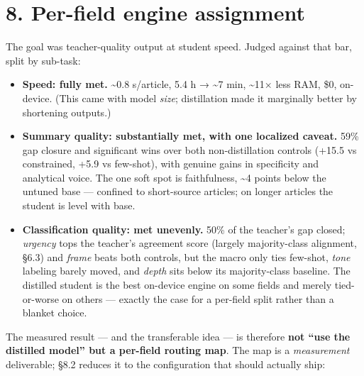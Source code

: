 \documentclass[11pt]{article}
\providecommand{\tightlist}{\setlength{\itemsep}{0pt}\setlength{\parskip}{0pt}}
\providecommand{\tightlist}{%
  \setlength{\itemsep}{0pt}\setlength{\parskip}{0pt}}
\begin{document}
\section{8. Per-field engine
assignment}\label{per-field-engine-assignment}

The goal was teacher-quality output at student speed. Judged against
that bar, split by sub-task:

\begin{itemize}
\tightlist
\item
  \textbf{Speed: fully met.} \textasciitilde0.8 s/article, 5.4 h →
  \textasciitilde7 min, \textasciitilde11× less RAM, \$0, on-device.
  (This came with model \emph{size}; distillation made it marginally
  better by shortening outputs.)
\item
  \textbf{Summary quality: substantially met, with one localized
  caveat.} 59\% gap closure and significant wins over both
  non-distillation controls (+15.5 vs constrained, +5.9 vs few-shot),
  with genuine gains in specificity and analytical voice. The one soft
  spot is faithfulness, \textasciitilde4 points below the untuned base
  --- confined to short-source articles; on longer articles the student
  is level with base.
\item
  \textbf{Classification quality: met unevenly.} 50\% of the teacher's
  gap closed; \emph{urgency} tops the teacher's agreement score (largely
  majority-class alignment, §6.3) and \emph{frame} beats both controls,
  but the macro only ties few-shot, \emph{tone} labeling barely moved,
  and \emph{depth} sits below its majority-class baseline. The distilled
  student is the best on-device engine on some fields and merely
  tied-or-worse on others --- exactly the case for a per-field split
  rather than a blanket choice.
\end{itemize}

The measured result --- and the transferable idea --- is therefore
\textbf{not ``use the distilled model'' but a per-field routing map}.
The map is a \emph{measurement} deliverable; §8.2 reduces it to the
configuration that should actually ship:
\end{document}
